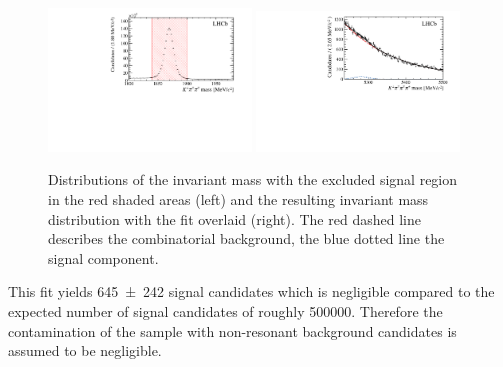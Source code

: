 \begin{figure}[tb]
    \centering
    \includegraphics[width=0.48\textwidth]{07selection/figs/DmassCut.pdf}
    \includegraphics[width=0.48\textwidth]{07selection/figs/Resulting_Bmass.pdf}
    \caption{Distributions of the invariant \Dm mass with the excluded signal region in the red shaded areas (left) and the resulting invariant \Bz mass distribution with the fit overlaid (right). The red dashed line describes the combinatorial background, the blue dotted line the signal component.}
    \label{fig:nonRes_Try2}
\end{figure}
This fit yields \num{645\pm242} signal candidates which is negligible compared to the expected number of \BdToDpi signal candidates of roughly \num{500000}.
Therefore the contamination of the sample with non-resonant background candidates is assumed to be negligible.
